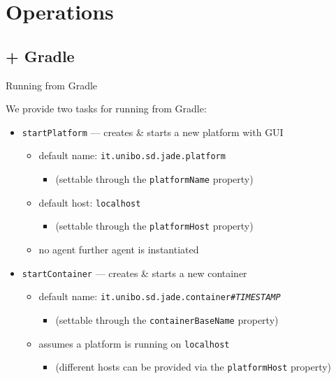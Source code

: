 \documentclass{beamer}\mode<presentation>{\usetheme{AMSCesenaPurpleAndGold}}
\begin{document}
\section{Operations}

\subsection{\jade{} + Gradle}

\begin{frame}{Running \jade{} from Gradle}

    We provide two tasks for running \jade{} from Gradle:
    \vfill
    \begin{itemize}
    	\item \alert{\texttt{startPlatform}} --- creates \& starts a new platform with GUI
    	\begin{itemize}
    		\item default name: \texttt{it.unibo.sd.jade.platform}
    		\begin{itemize}
				\item (settable through the \texttt{platformName} property)
    		\end{itemize}

    		\item default host: \texttt{localhost}
    		\begin{itemize}
    			\item (settable through the \texttt{platformHost} property)
    		\end{itemize}

    		\item \alert{no agent} further agent is instantiated
    	\end{itemize}

    	\vfill

	    \item \alert{\texttt{startContainer}} --- creates \& starts a new container
	    \begin{itemize}

	    	\item default name: \texttt{it.unibo.sd.jade.container\#\textit{TIMESTAMP}}
	    	\begin{itemize}
	    		\item (settable through the \texttt{containerBaseName} property)
	    	\end{itemize}

	    	\item assumes a platform is running on \texttt{localhost}
	    	\begin{itemize}
	    		\item (different hosts can be provided via the \texttt{platformHost} property)
	    	\end{itemize}


\end{itemize}
\end{itemize}
\end{frame}
\end{document}
